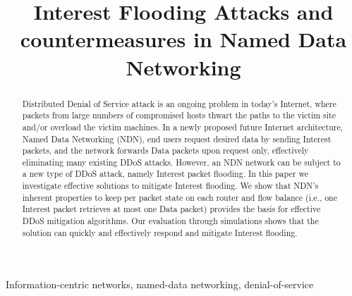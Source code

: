 \documentclass[conference]{IEEEtran}
\title{Interest Flooding Attacks and countermeasures in Named Data Networking}%
\begin{document}
\maketitle

\begin{abstract}
Distributed Denial of Service attack is an ongoing problem in today's Internet, where packets from large numbers of compromised hosts thwart the paths to the victim site and/or overload the victim machines. 
In a newly proposed future Internet architecture, Named Data Networking (NDN), end users request desired data by sending Interest packets, and the network forwards Data packets upon request only, effectively eliminating many existing DDoS attacks. 
However, an NDN network can be subject to a new type of DDoS attack, namely Interest packet flooding.  
In this paper we investigate effective solutions to mitigate Interest flooding.
We show that NDN's inherent properties to keep per packet state on each router and flow balance (i.e., one Interest packet retrieves at most one Data packet) provides the  basis for effective DDoS mitigation algorithms.
Our evaluation through simulations shows that the solution can quickly and effectively respond and mitigate Interest flooding.
\end{abstract}

\begin{IEEEkeywords}
Information-centric networks, named-data networking, denial-of-service
\end{IEEEkeywords}



















{\small 

}
\end{document}
